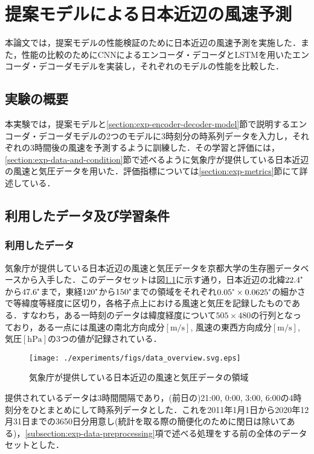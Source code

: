 \chapter{提案モデルによる日本近辺の風速予測\label{chap:experiments}}
本論文では，提案モデルの性能検証のために日本近辺の風速予測を実施した．また，性能の比較のためにCNNによるエンコーダ・デコーダとLSTMを用いたエンコーダ・デコーダモデルを実装し，それぞれのモデルの性能を比較した．

\section{実験の概要 \label{section:exp-overview}}
本実験では，提案モデルと\ref{section:exp-encoder-decoder-model}節で説明するエンコーダ・デコーダモデルの2つのモデルに3時刻分の時系列データを入力し，それぞれの3時間後の風速を予測するように訓練した．その学習と評価には，\ref{section:exp-data-and-condition}節で述べるように気象庁が提供している日本近辺の風速と気圧データを用いた．評価指標については\ref{section:exp-metrics}節にて詳述している．

\section{利用したデータ及び学習条件 \label{section:exp-data-and-condition}}
\subsection{利用したデータ \label{subsection:exp-data}}
気象庁が提供している日本近辺の風速と気圧データを京都大学の生存圏データベース\cite{Seizonken2004}から入手した．このデータセットは図\ref{fig:exp-data-overview}に示す通り，日本近辺の北緯$22.4\tcdegree$から$47.6\tcdegree$まで，東経$120\tcdegree$から$150\tcdegree$までの領域をそれぞれ$0.05\tcdegree \times 0.0625\tcdegree$の細かさで等緯度等経度に区切り，各格子点上における風速と気圧を記録したものである\cite{JMBSC2022}．すなわち，ある一時刻のデータは緯度経度について$505 \times 480$の行列となっており，ある一点には風速の南北方向成分$[\mathrm{m/s}]$, 風速の東西方向成分$[\mathrm{m/s}]$, 気圧$[\mathrm{hPa}]$の3つの値が記録されている．
\begin{figure}[bp]
  \centering
  \texttt{[image: ./experiments/figs/data\_overview.svg.eps]}
  \caption{気象庁が提供している日本近辺の風速と気圧データの領域}
  \label{fig:exp-data-overview}
\end{figure}

提供されているデータは3時間間隔であり，(前日の)21:00, 0:00, 3:00, 6:00の4時刻分をひとまとめにして時系列データとした．これを2011年1月1日から2020年12月31日までの3650日分用意し(統計を取る際の簡便化のために閏日は除いてある)，\ref{subsection:exp-data-preprocessing}項で述べる処理をする前の全体のデータセットとした．

